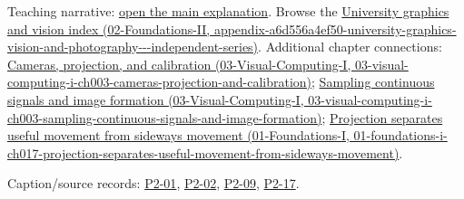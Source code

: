 Teaching narrative: \hyperref[04-visual-computing-ii-ch032-finite-field-projections-turn-image-size-into-collision-counts]{open the main explanation}. Browse the \href{../02-Foundations-II/main.pdf\#nameddest=appendix-a6d556a4ef50-university-graphics-vision-and-photography---independent-series}{University graphics and vision index (02-Foundations-II, appendix-a6d556a4ef50-university-graphics-vision-and-photography-\/-\/-independent-series)}. Additional chapter connections: \href{../03-Visual-Computing-I/main.pdf\#nameddest=03-visual-computing-i-ch003-cameras-projection-and-calibration}{Cameras, projection, and calibration (03-Visual-Computing-I, 03-visual-computing-i-ch003-cameras-projection-and-calibration)}; \href{../03-Visual-Computing-I/main.pdf\#nameddest=03-visual-computing-i-ch003-sampling-continuous-signals-and-image-formation}{Sampling continuous signals and image formation (03-Visual-Computing-I, 03-visual-computing-i-ch003-sampling-continuous-signals-and-image-formation)}; \href{../01-Foundations-I/main.pdf\#nameddest=01-foundations-i-ch017-projection-separates-useful-movement-from-sideways-movement}{Projection separates useful movement from sideways movement (01-Foundations-I, 01-foundations-i-ch017-projection-separates-useful-movement-from-sideways-movement)}.

Caption/source records: \hyperref[04-visual-computing-ii-ch036-p2-01---lecture-01-introduction-to-projection-theory]{P2-01}, \hyperref[04-visual-computing-ii-ch036-p2-02---lecture-02-fundamental-methods-of-projection-theory]{P2-02}, \hyperref[04-visual-computing-ii-ch036-p2-09---lecture-09-reflections-on-the-szemeredi-trotter-theorem]{P2-09}, \hyperref[04-visual-computing-ii-ch036-p2-17---lecture-17-random-walks-on-finite-groups-part-1]{P2-17}.
